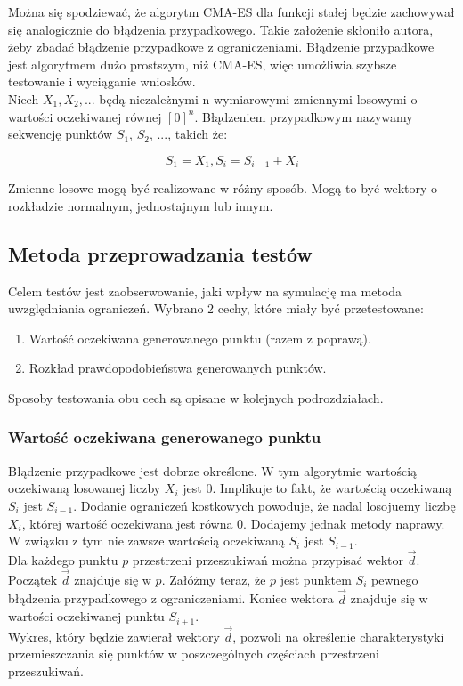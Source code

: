 \documentclass{mini}
\begin{document}
Można się spodziewać, że algorytm CMA-ES dla funkcji stałej będzie zachowywał się analogicznie do błądzenia przypadkowego. Takie założenie skłoniło autora, żeby zbadać błądzenie przypadkowe z ograniczeniami. Błądzenie przypadkowe jest algorytmem dużo prostszym, niż CMA-ES, więc umożliwia szybsze testowanie i wyciąganie wniosków.\\
Niech $ X_1, X_2, ... $ będą niezależnymi n-wymiarowymi zmiennymi losowymi o wartości oczekiwanej równej $ [0]^n $. Błądzeniem przypadkowym nazywamy sekwencję punktów $S_1$, $S_2$, ..., takich że:

\begin{equation}
S_1 = X_1, S_i=S_{i-1}+X_i
\end{equation}

Zmienne losowe mogą być realizowane w różny sposób. Mogą to być wektory o rozkładzie normalnym, jednostajnym lub innym.

\subsection{Metoda przeprowadzania testów}
Celem testów jest zaobserwowanie, jaki wpływ na symulację ma metoda uwzględniania ograniczeń. Wybrano 2 cechy, które miały być przetestowane:
\begin{enumerate}
\item Wartość oczekiwana generowanego punktu (razem z poprawą).
\item Rozkład prawdopodobieństwa generowanych punktów.
\end{enumerate}

Sposoby testowania obu cech są opisane w kolejnych podrozdziałach.

\subsubsection{Wartość oczekiwana generowanego punktu}
Błądzenie przypadkowe jest dobrze określone. W tym algorytmie wartością oczekiwaną losowanej liczby $X_i$ jest 0. Implikuje to fakt, że wartością oczekiwaną $S_i$ jest $S_{i-1}$. Dodanie ograniczeń kostkowych powoduje, że nadal losojuemy liczbę $X_i$, której wartość oczekiwana jest równa 0. Dodajemy jednak metody naprawy. W związku z tym nie zawsze wartością oczekiwaną $S_i$ jest $S_{i-1}$.\\
Dla każdego punktu $p$ przestrzeni przeszukiwań można przypisać wektor $\overrightarrow{d}$. Początek $\overrightarrow{d}$ znajduje się w $p$. Załóżmy teraz, że $p$ jest punktem $S_i$ pewnego błądzenia przypadkowego z ograniczeniami. Koniec wektora $\overrightarrow{d}$ znajduje się w wartości oczekiwanej punktu $S_{i+1}$.\\
Wykres, który będzie zawierał wektory $\overrightarrow{d}$, pozwoli na określenie charakterystyki przemieszczania się punktów w poszczególnych częściach przestrzeni przeszukiwań.\\
\end{document}
